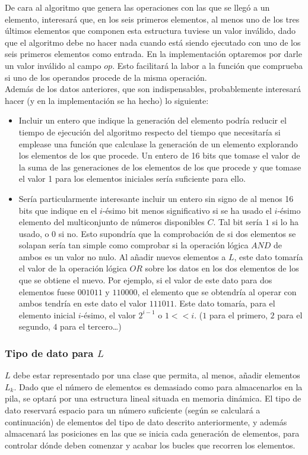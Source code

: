 De cara al algoritmo que genera las operaciones con las que se llegó a un
elemento, interesará que, en los seis primeros elementos, al menos uno de los
tres últimos elementos que componen esta estructura tuviese un valor inválido,
dado que el algoritmo debe no hacer nada cuando está siendo ejecutado con uno
de los seis primeros elementos como entrada. En la implementación optaremos
por darle un valor inválido al campo $op$. Esto facilitará la labor a la función
que comprueba si uno de los operandos procede de la misma operación. \\

Además de los datos anteriores, que son indispensables, probablemente
interesará hacer (y en la implementación se ha hecho) lo siguiente:

\begin{itemize}
	\item Incluir un entero que indique la generación del elemento podría reducir
	el tiempo de ejecución del algoritmo respecto del tiempo que necesitaría si
	emplease una función que calculase la generación de un elemento explorando los
	 elementos de los que procede. Un entero de 16 bits que tomase el valor de la
	  suma de las generaciones de los elementos de los que procede y que tomase el
		 valor 1 para los elementos iniciales sería suficiente para ello.
	\item Sería particularmente interesante incluir un entero sin signo de al
	menos 16 bits que indique en el $i$-ésimo bit menos significativo si se ha
	usado el $i$-ésimo elemento del multiconjunto de números disponibles $C$. Tal
	bit sería $1$ si lo ha usado, o $0$ si no. Esto supondría que la comprobación
	de si dos elementos se solapan sería tan simple como comprobar si la operación
	lógica $AND$ de ambos es un valor no nulo. Al añadir nuevos elementos a $L$,
	este dato tomaría el valor de la operación lógica $OR$ sobre los datos en los
	dos elementos de los que se obtiene el nuevo. Por ejemplo, si el valor de
	este dato para dos elementos fuese $001011$ y $110000$, el elemento que se
	obtendría al operar con ambos tendría en este dato el valor $111011$. Este
	dato tomaría, para el elemento inicial $i$-ésimo, el valor $2^{i-1}$ o
	$1 << i$. ($1$ para el primero, $2$ para el segundo, $4$ para el tercero\ldots)
\end{itemize}

\subsubsection{Tipo de dato para $L$}
$L$ debe estar representado por una clase que permita, al menos, añadir elementos $L_k$. Dado que el número de elementos es demasiado como para almacenarlos en la pila, se optará por una estructura lineal situada en memoria dinámica. El tipo de dato reservará espacio para un número suficiente (según se calculará a continuación) de elementos del tipo de dato descrito anteriormente, y además almacenará las posiciones en las que se inicia cada generación de elementos, para controlar dónde deben comenzar y acabar los bucles que recorren los elementos. \\

